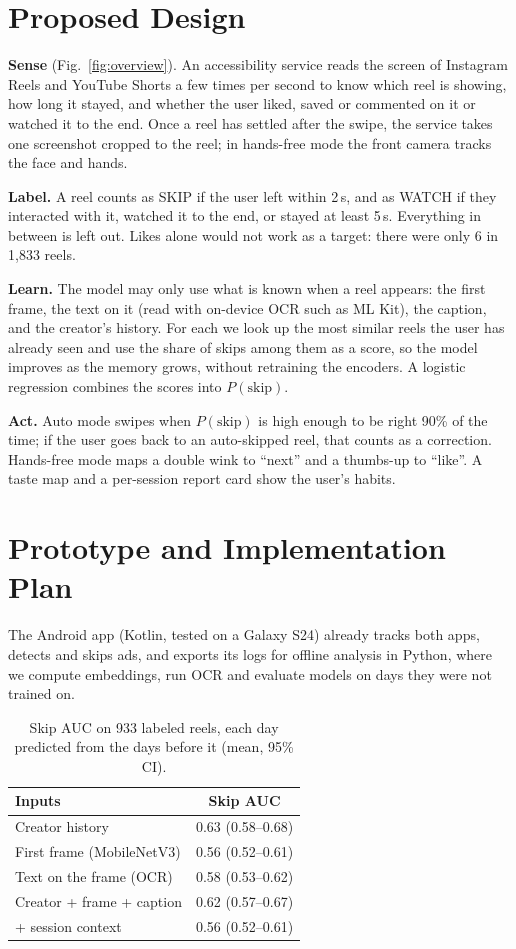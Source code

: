 \documentclass[sigconf,nonacm]{acmart}
\begin{document}
\section{Proposed Design}
\textbf{Sense} (Fig.~\ref{fig:overview}). An accessibility service reads the screen of
Instagram Reels and YouTube Shorts a few times per second to know which reel is showing, how
long it stayed, and whether the user liked, saved or commented on it or watched it to the end.
Once a reel has settled after the swipe, the service takes one screenshot cropped to the reel;
in hands-free mode the front camera tracks the face and hands.

\textbf{Label.} A reel counts as SKIP if the user left within 2\,s, and as WATCH if they
interacted with it, watched it to the end, or stayed at least 5\,s. Everything in between is
left out. Likes alone would not work as a target: there were only 6 in 1{,}833 reels.

\textbf{Learn.} The model may only use what is known when a reel appears: the first frame, the
text on it (read with on-device OCR such as ML Kit), the caption, and the creator's history.
For each we look up the most similar reels the user has already seen and use the share of skips
among them as a score, so the model improves as the memory grows, without retraining the
encoders. A logistic regression combines the scores into $P(\text{skip})$.

\textbf{Act.} Auto mode swipes when $P(\text{skip})$ is high enough to be right 90\% of the
time; if the user goes back to an auto-skipped reel, that counts as a correction. Hands-free
mode maps a double wink to ``next'' and a thumbs-up to ``like''. A taste map and a per-session
report card show the user's habits.

\section{Prototype and Implementation Plan}
The Android app (Kotlin, tested on a Galaxy S24) already tracks both apps, detects and skips
ads, and exports its logs for offline analysis in Python, where we compute embeddings, run OCR
and evaluate models on days they were not trained on.

\begin{table}[t]
  \caption{Skip AUC on 933 labeled reels, each day predicted from the days before it (mean,
  95\% CI).}
  \label{tab:prelim}
  \small
  \begin{tabular}{@{}lc@{}}
    \toprule
    Inputs & Skip AUC \\
    \midrule
    Creator history & 0.63 (0.58--0.68) \\
    First frame (MobileNetV3) & 0.56 (0.52--0.61) \\
    Text on the frame (OCR) & 0.58 (0.53--0.62) \\
    Creator + frame + caption & 0.62 (0.57--0.67) \\
    \quad + session context & 0.56 (0.52--0.61) \\
    \bottomrule
  \end{tabular}
\end{table}
\end{document}
